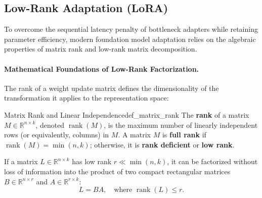\documentclass[../../../main.tex]{subfiles}
\begin{document}
\subsection{Low-Rank Adaptation (LoRA)}
\label{subsec:low_rank_adaptation_lora}

To overcome the sequential latency penalty of bottleneck adapters while retaining parameter efficiency, modern foundation model adaptation relies on the algebraic properties of matrix rank and low-rank matrix decomposition.

\paragraph{Mathematical Foundations of Low-Rank Factorization.}
The rank of a weight update matrix defines the dimensionality of the transformation it applies to the representation space:

\begin{definition}{Matrix Rank and Linear Independence}{def_matrix_rank}
The \textbf{rank} of a matrix $M \in \mathbb{R}^{n \times k}$, denoted $\operatorname{rank}(M)$, is the maximum number of linearly independent rows (or equivalently, columns) in $M$. A matrix $M$ is \textbf{full rank} if $\operatorname{rank}(M) = \min(n, k)$; otherwise, it is \textbf{rank deficient} or \textbf{low rank}.
\end{definition}

If a matrix $L \in \mathbb{R}^{n \times k}$ has low rank $r \ll \min(n, k)$, it can be factorized without loss of information into the product of two compact rectangular matrices $B \in \mathbb{R}^{n \times r}$ and $A \in \mathbb{R}^{r \times k}$:
\begin{equation}
\label{eq:low_rank_factorization}
L = B A, \quad \text{where } \operatorname{rank}(L) \le r.
\end{equation}
\end{document}
